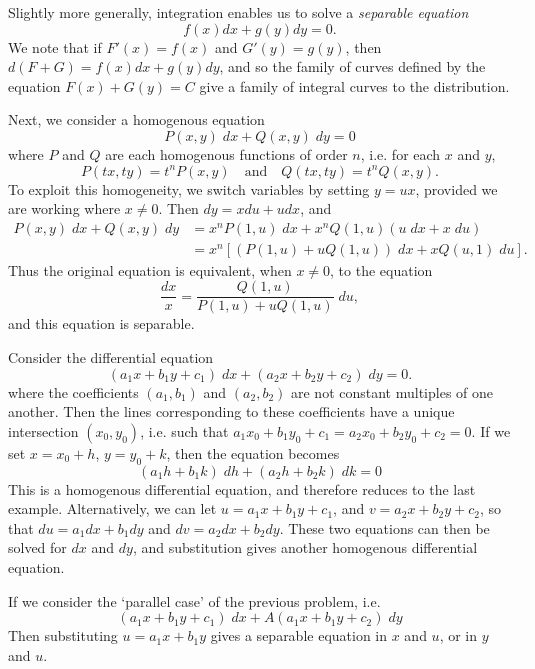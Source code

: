 Slightly more generally, integration enables us to solve a \emph{separable equation}
%
\[ f(x) dx + g(y) dy = 0. \]
%
We note that if $F'(x) = f(x)$ and $G'(y) = g(y)$, then $d(F + G) = f(x) dx + g(y) dy$, and so the family of curves defined by the equation $F(x) + G(y) = C$ give a family of integral curves to the distribution.

\begin{example}
Next, we consider a homogenous equation
%
\[ P(x,y)\; dx + Q(x,y)\; dy = 0 \]
%
where $P$ and $Q$ are each homogenous functions of order $n$, i.e. for each $x$ and $y$,
%
\[ P(tx,ty) = t^n P(x,y)\quad \text{and}\quad Q(tx,ty) = t^n Q(x,y). \]
%
To exploit this homogeneity, we switch variables by setting $y = ux$, provided we are working where $x \neq 0$. Then $dy = x du + u dx$, and
%
\begin{align*}
    P(x,y)\; dx + Q(x,y)\; dy &= x^n P(1,u)\; dx + x^n Q(1,u)(u\; dx + x\; du)\\
    &= x^n[(P(1,u) + u Q(1,u))\; dx + x Q(u,1)\; du].
\end{align*}
%
Thus the original equation is equivalent, when $x \neq 0$, to the equation
%
\[ \frac{dx}{x} = \frac{Q(1,u)}{P(1,u) + u Q(1,u)}\; du, \]
%
and this equation is separable.
\end{example}

\begin{example}
    Consider the differential equation
    \[ (a_1x + b_1y + c_1)\; dx + (a_2 x + b_2 y + c_2)\; dy = 0. \]
    where the coefficients $(a_1, b_1)$ and $(a_2, b_2)$ are not constant multiples of one another. Then the lines corresponding to these coefficients have a unique intersection $(x_0,y_0)$, i.e. such that $a_1x_0 + b_1y_0 + c_1 = a_2x_0 + b_2y_0 + c_2 = 0$. If we set $x = x_0 + h$, $y = y_0 + k$, then the equation becomes
    \[ (a_1h + b_1k)\; dh + (a_2 h + b_2 k)\; dk = 0 \]
    This is a homogenous differential equation, and therefore reduces to the last example. Alternatively, we can let $u = a_1x + b_1y + c_1$, and $v = a_2x + b_2y + c_2$, so that $du = a_1dx + b_1dy$ and $dv = a_2dx + b_2dy$. These two equations can then be solved for $dx$ and $dy$, and substitution gives another homogenous differential equation.
\end{example}

\begin{example}
    If we consider the `parallel case' of the previous problem, i.e.
    \[ (a_1 x + b_1y + c_1)\; dx + A(a_1x + b_1y + c_2)\; dy \]
    Then substituting $u = a_1x + b_1y$ gives a separable equation in $x$ and $u$, or in $y$ and $u$.
\end{example}

